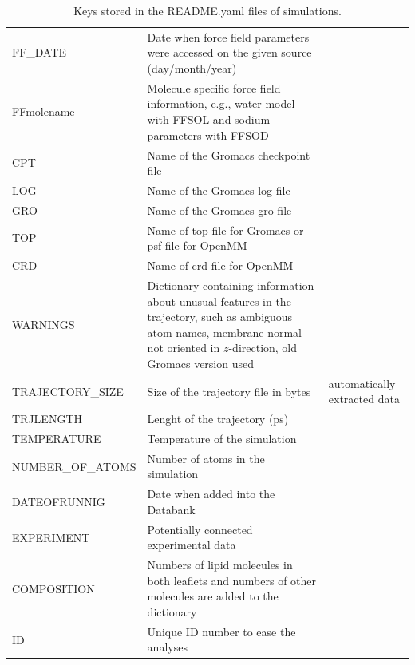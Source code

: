 \documentclass[fleqn,10pt]{wlscirepSI}
\begin{document}
\begin{table}[p]
\begin{tabular}{  p{3.5cm}  p{9.5cm}  p{4.0cm} }
    FF\_DATE &  Date when force field parameters were accessed on the given source (day/month/year) & \\
    FF{molename} & Molecule specific force field information, e.g., water model with FFSOL and sodium parameters with FFSOD & \\
    CPT & Name of the Gromacs checkpoint file & \\
    LOG & Name of the Gromacs log file & \\
    GRO & Name of the Gromacs gro file & \\
    TOP & Name of top file for Gromacs or psf file for OpenMM & \\
    CRD & Name of crd file for OpenMM & \\
    WARNINGS & Dictionary containing information about unusual features in the trajectory, such as ambiguous atom names, membrane normal not oriented in $z$-direction, old Gromacs version used & \\
    \hline
    TRAJECTORY\_SIZE & Size of the trajectory file in bytes & automatically extracted data \\
    TRJLENGTH & Lenght of the trajectory (ps) & \\
    TEMPERATURE & Temperature of the simulation & \\
    NUMBER\_OF\_ATOMS & Number of atoms in the simulation & \\
    DATEOFRUNNIG & Date when added into the Databank & \\
    EXPERIMENT & Potentially connected experimental data & \\
    COMPOSITION & Numbers of lipid molecules in both leaflets and numbers of other molecules are added to the dictionary & \\
    ID & Unique ID number to ease the analyses & \\
    \end{tabular}
    \caption{Keys stored in the README.yaml files of simulations.}
    \label{tab:READMEkeys}
\end{table}
\end{document}
